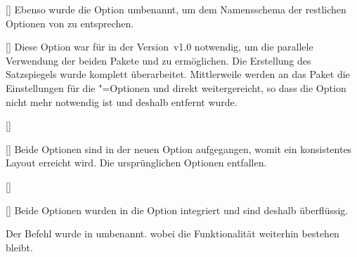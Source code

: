 \begin{Declaration}[v2.00]{[\PBoolean]}
%
Ebenso wurde die Option  umbenannt, um dem Namensschema der 
restlichen Optionen von \TUDScript zu entsprechen.
\end{Declaration}

\begin{Declaration}[v2.00]{[\PSet]}
%
Diese Option war für \TUDScript in der Version~v1.0 notwendig, um die parallele 
Verwendung der beiden Pakete  und  zu 
ermöglichen. Die Erstellung des Satzspiegels wurde komplett überarbeitet. 
Mittlerweile werden an das Paket  die Einstellungen für die 
\KOMAScript"=Optionen  und  direkt 
weitergereicht, so dass die Option  nicht mehr notwendig ist 
und deshalb entfernt wurde.
\end{Declaration}

\begin{Declaration}[v2.00]{[\PBoolean]}
\begin{Declaration}[v2.00]{[\PBoolean]}
%
Beide Optionen sind in der neuen Option  
aufgegangen, womit ein konsistentes Layout erreicht wird. Die ursprünglichen 
Optionen entfallen. 
\end{Declaration}
\end{Declaration}

\begin{Declaration}[v2.00]{[\PBoolean]}
\begin{Declaration}[v2.00]{[\PBoolean]}
%
Beide Optionen wurden in die Option  integriert und sind 
deshalb überflüssig.
\end{Declaration}
\end{Declaration}

\begin{Declaration}[v2.00]{}
%
Der Befehl  wurde in  umbenannt. wobei die 
Funktionalität weiterhin bestehen bleibt.
\end{Declaration}

